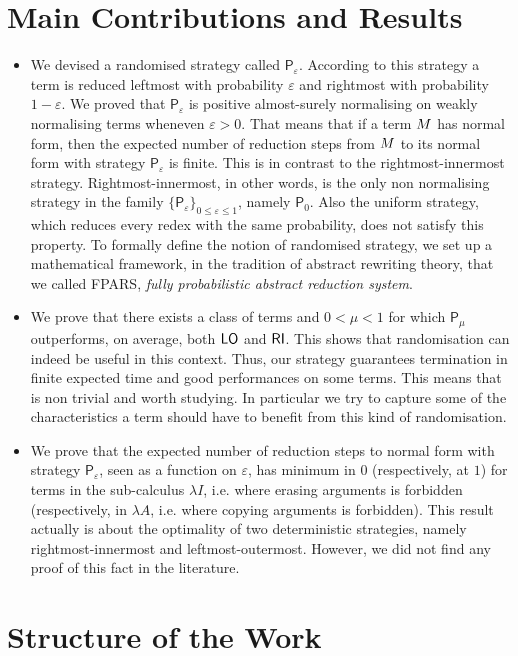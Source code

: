 \section{Main Contributions and Results}
\begin{itemize}
\item We devised a randomised strategy called $\mathsf{P}_\varepsilon$. According to this strategy a term is reduced leftmost with probability $\varepsilon$ and rightmost with probability $1-\varepsilon$. We proved that $\mathsf{P}_\varepsilon$ is positive almost-surely normalising on
weakly normalising terms wheneven $\varepsilon>0$. That means that if a term $M$ has normal form, then the expected number of reduction steps from
$M$ to its normal form with strategy $\mathsf{P}_\varepsilon$
is finite. This is in contrast to the rightmost-innermost strategy. Rightmost-innermost, in other
words, is the only non normalising strategy in the family
$\{\mathsf{P}_\varepsilon\}_{0\leq\varepsilon\leq 1}$, namely $\mathsf{P}_0$. Also the uniform strategy, which reduces every redex with the same probability, does not satisfy this property. To formally define the notion of randomised strategy, we set up a mathematical framework, in the tradition of abstract rewriting theory, that we called FPARS, \emph{fully probabilistic abstract reduction system}.
\item We prove that there exists a class of terms and
$0<\mu<1$ for which $\mathsf{P}_\mu$ outperforms, on average, both
$\textsf{LO}$ and $\textsf{RI}$. This shows that randomisation can
indeed be useful in this context. Thus, our strategy guarantees termination in finite expected time and good performances on some terms. This means that is non trivial and worth studying. In particular we try to capture some of the characteristics a term should have to benefit from this kind of randomisation.
\item We prove that the expected number of reduction steps to
normal form with strategy $\mathsf{P}_\varepsilon$, seen as a function
on $\varepsilon$, has minimum in $0$ (respectively, at $1$) for terms
in the sub-calculus $\lambda I$, i.e. where erasing arguments is forbidden (respectively, in $\lambda A$, i.e. where copying arguments is forbidden). This result actually is about the optimality of two deterministic strategies, namely rightmost-innermost and leftmost-outermost. However, we did not find any proof of this fact in the literature.
\end{itemize}
\section{Structure of the Work}
